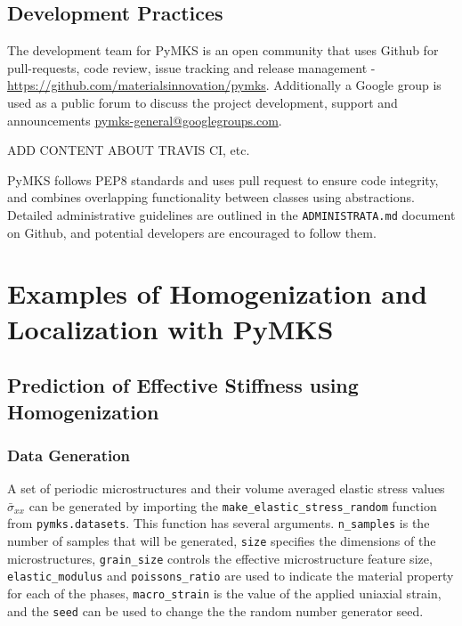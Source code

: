 \documentclass{bmcart}
\begin{document}
\subsection{Development Practices}

The development team for PyMKS is an open community that uses Github for pull-requests, code review, issue tracking and release management - \\ \url{https://github.com/materialsinnovation/pymks}. Additionally a Google group is used as a public forum to discuss the project development, support and announcements \url{pymks-general@googlegroups.com}.

ADD CONTENT ABOUT TRAVIS CI, etc.

PyMKS follows PEP8 standards and uses pull request to ensure code integrity, and combines overlapping functionality between classes using abstractions. Detailed administrative guidelines are outlined in the \texttt{ADMINISTRATA.md} document on Github, and potential developers are encouraged to follow them.

\section{Examples of Homogenization and Localization with PyMKS}



    \subsection{Prediction of Effective Stiffness using Homogenization}\label{effective-stiffness-of-composite-material}

    \subsubsection{Data Generation}\label{data-generation}

A set of periodic microstructures and their volume averaged elastic
stress values $\bar{\sigma}_{xx}$ can be generated by importing the
\texttt{make\_elastic\_stress\_random} function from
\texttt{pymks.datasets}. This function has several arguments.
\texttt{n\_samples} is the number of samples that will be generated,
\texttt{size} specifies the dimensions of the microstructures,
\texttt{grain\_size} controls the effective microstructure feature size,
\texttt{elastic\_modulus} and \texttt{poissons\_ratio} are used to
indicate the material property for each of the phases,
\texttt{macro\_strain} is the value of the applied uniaxial strain, and
the \texttt{seed} can be used to change the the random number generator
seed.
\end{document}
